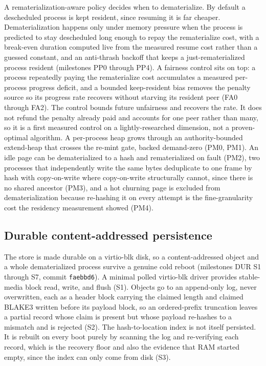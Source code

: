 \documentclass[10pt,twocolumn]{article}
\begin{document}
A rematerialization-aware policy decides when to dematerialize. By default a
descheduled process is kept resident, since resuming it is far cheaper.
Dematerialization happens only under memory pressure when the process is predicted
to stay descheduled long enough to repay the rematerialize cost, with a break-even
duration computed live from the measured resume cost rather than a guessed
constant, and an anti-thrash backoff that keeps a just-rematerialized process
resident (milestones PP0 through PP4). A fairness control sits on top: a process
repeatedly paying the rematerialize cost accumulates a measured per-process
progress deficit, and a bounded keep-resident bias removes the penalty source so
its progress rate recovers without starving its resident peer (FA0 through FA2).
The control bounds future unfairness and recovers the rate. It does not refund the
penalty already paid and accounts for one peer rather than many, so it is a first
measured control on a lightly-researched dimension, not a proven-optimal
algorithm. A per-process heap grows through an authority-bounded extend-heap that
crosses the re-mint gate, backed demand-zero (PM0, PM1). An idle page can be
dematerialized to a hash and rematerialized on fault (PM2), two processes that
independently write the same bytes deduplicate to one frame by hash with
copy-on-write where copy-on-write structurally cannot, since there is no shared
ancestor (PM3), and a hot churning page is excluded from dematerialization because
re-hashing it on every attempt is the fine-granularity cost the residency
measurement showed (PM4).

\subsection{Durable content-addressed persistence}

The store is made durable on a virtio-blk disk, so a content-addressed object and
a whole dematerialized process survive a genuine cold reboot (milestones DUR S1
through S7, commit \texttt{faebbd6}). A minimal polled virtio-blk driver provides
stable-media block read, write, and flush (S1). Objects go to an append-only log,
never overwritten, each as a header block carrying the claimed length and claimed
BLAKE3 written before its payload block, so an ordered-prefix truncation leaves a
partial record whose claim is present but whose payload re-hashes to a mismatch
and is rejected (S2). The hash-to-location index is not itself persisted. It is
rebuilt on every boot purely by scanning the log and re-verifying each record,
which is the recovery floor and also the evidence that RAM started empty, since
the index can only come from disk (S3).
\end{document}
